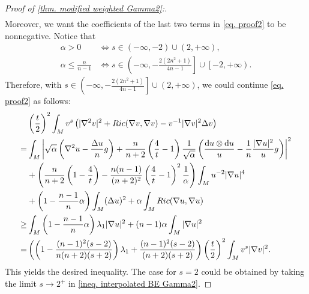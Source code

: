 \documentclass[11pt]{amsart}
\numberwithin{equation}{section}
\numberwithin{lemma}{section}
\numberwithin{proposition}{section}
\numberwithin{corollary}{section}
\numberwithin{remark}{section}
\newcommand{\dd}{\mathop{}\!\mathrm{d}}%
\begin{document}
\begin{proof}[Proof of \cref{thm. modified weighted Gamma2}:]
\begin{align*}
 \end{align*}
 Moreover, we want  the coefficients of the last two terms in \cref{eq. proof2} to be nonnegative. Notice that
 \begin{align*}
     \alpha>0&\Longleftrightarrow
     s\in (-\infty,-2)\cup \left(2,+\infty\right),\\
     \alpha\leq \frac{n}{n-1}
     &\Longleftrightarrow
     s\in\left(-\infty,-\frac{2(2n^2+1)}{4n-1}\right]\cup
     \left[-2,+\infty\right).
 \end{align*}
 Therefore, with $s\in\left(-\infty,-\frac{2(2n^2+1)}{4n-1}\right]\cup(2,+\infty)$, we could continue \cref{eq. proof2} as follows:
 \begin{align*}
     & \left(\frac{t}{2}\right)^2
     \int_{M} v^s
     \left(|\nabla^2 v|^2
     +Ric(\nabla v,\nabla v)
     -v^{-1}|\nabla v|^2\Delta v
     \right)\\
     =&\int_M \left|\sqrt{\alpha}
     \left(\nabla^2 u-\frac{\Delta u}{n}g\right)
     +\frac{n}{n+2}\left(\frac{4}{t}-1\right)\frac{1}{\sqrt{\alpha}}
     \left(\frac{\dd u\otimes \dd u}{u}-\frac{1}{n}\frac{|\nabla u|^2}{u}g\right)\right|^2
     \notag\\
     &+\left(
     \frac{n}{n+2}\left(1-\frac{4}{t}\right)
     -\frac{n(n-1)}{(n+2)^2}\left(\frac{4}{t}-1\right)^2\frac{1}{\alpha}
     \right)
     \int_M u^{-2}|\nabla u|^4\notag
     \\
     &+\left(1-\frac{n-1}{n}\alpha\right)
     \int_M (\Delta u)^2
     +\alpha \int_M Ric(\nabla u,\nabla u)\\
     \geq& \int_M \left(1-\frac{n-1}{n}\alpha\right)\lambda_1|\nabla u|^2
     +(n-1)\alpha\int_M |\nabla u|^2\\
     =&\left(\left(1-\frac{(n-1)^2(s-2)}{n(n+2)(s+2)}
        \right)\lambda_1
        +\frac{(n-1)^2(s-2)}{(n+2)(s+2)}
        \right)
        \left(\frac{t}{2}\right)^2
        \int_M v^s|\nabla v|^2.
 \end{align*}
This yields the desired inequality.
 The case for $s=2$ could be obtained by taking the limit $s\to 2^+$ in \cref{ineq. interpolated BE Gamma2}. 

\end{proof}
\end{document}
